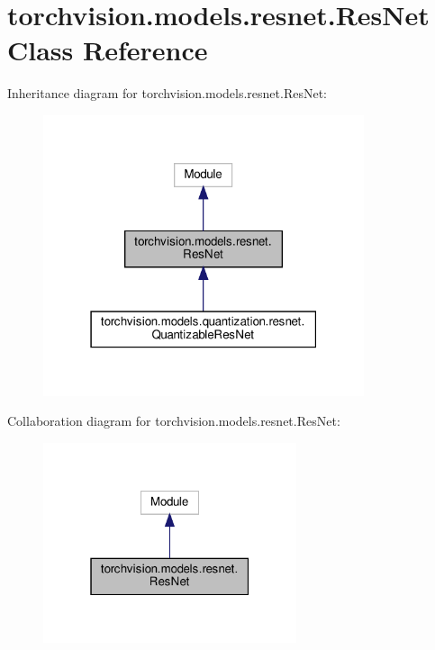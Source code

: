 \hypertarget{classtorchvision_1_1models_1_1resnet_1_1ResNet}{}\section{torchvision.\+models.\+resnet.\+Res\+Net Class Reference}
\label{classtorchvision_1_1models_1_1resnet_1_1ResNet}


Inheritance diagram for torchvision.\+models.\+resnet.\+Res\+Net\+:
\nopagebreak
\begin{figure}[H]
\begin{center}
\leavevmode
\includegraphics[width=267pt]{classtorchvision_1_1models_1_1resnet_1_1ResNet__inherit__graph}
\end{center}
\end{figure}


Collaboration diagram for torchvision.\+models.\+resnet.\+Res\+Net\+:
\nopagebreak
\begin{figure}[H]
\begin{center}
\leavevmode
\includegraphics[width=211pt]{classtorchvision_1_1models_1_1resnet_1_1ResNet__coll__graph}
\end{center}
\end{figure}
